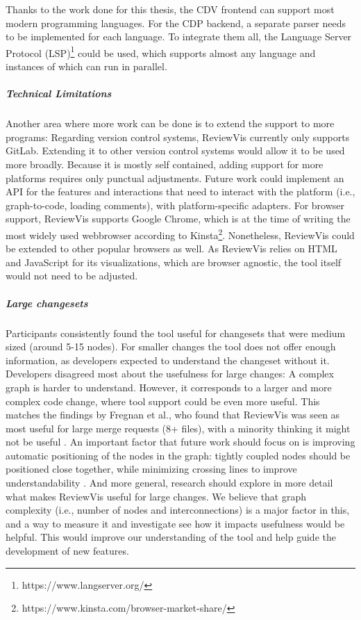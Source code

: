 \documentclass[a4paper,11pt,twoside]{article}
\theoremstyle{definition} %
\renewcommand{\cite}[1]{\citep{#1}}
\begin{document}
Thanks to the work done for this thesis, the CDV frontend can support most modern programming languages. For the CDP backend, a separate parser needs to be implemented for each language. To integrate them all, the Language Server Protocol (LSP)\footnote{https://www.langserver.org/} could be used, which supports almost any language and instances of which can run in parallel.

\subparagraph{Technical Limitations}
Another area where more work can be done is to extend the support to more programs: Regarding version control systems, ReviewVis currently only supports GitLab. Extending it to other version control systems would allow it to be used more broadly. Because it is mostly self contained, adding support for more platforms requires only punctual adjustments. Future work could implement an API for the features and interactions that need to interact with the platform (i.e., graph-to-code, loading comments), with platform-specific adapters.
For browser support, ReviewVis supports Google Chrome, which is at the time of writing the most widely used webbrowser according to Kinsta\footnote{https://www.kinsta.com/browser-market-share/}. Nonetheless, ReviewVis could be extended to other popular browsers as well. As ReviewVis relies on HTML and JavaScript for its visualizations, which are browser agnostic, the tool itself would not need to be adjusted.

\subparagraph{Large changesets}
Participants consistently found the tool useful for changesets that were medium sized (around 5-15 nodes). For smaller changes the tool does not offer enough information, as developers expected to understand the changeset without it. Developers disagreed most about the usefulness for large changes: A complex graph is harder to understand. However, it corresponds to a larger and more complex code change, where tool support could be even more useful. This matches the findings by Fregnan et al., who found that ReviewVis was seen as most useful for large merge requests (8+ files), with a minority thinking it might not be useful \cite{cr_visualization_major}. 
An important factor that future work should focus on is improving automatic positioning of the nodes in the graph: tightly coupled nodes should be positioned close together, while minimizing crossing lines to improve understandability \cite{10.1007/BFb0021827}. And more general, research should explore in more detail what makes ReviewVis useful for large changes. We believe that graph complexity (i.e., number of nodes and interconnections) is a major factor in this, and a way to measure it and investigate see how it impacts usefulness would be helpful. This would improve our understanding of the tool and help guide the development of new features.
\end{document}
